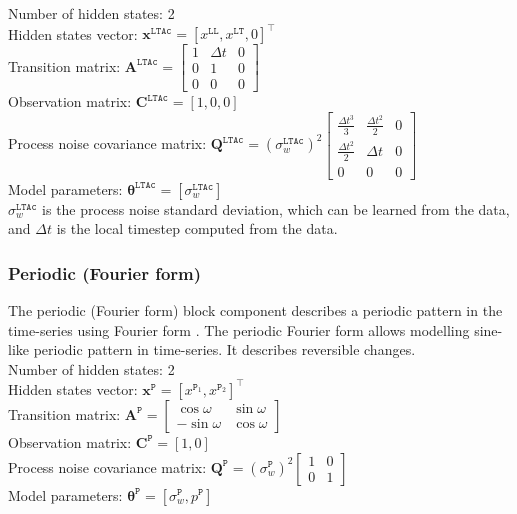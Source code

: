 \noindent
Number of hidden states: 2\\
Hidden states vector: $ \mathbf{x}^{\mathtt{LTAc}} = [x^{\mathtt{LL}}, x^{\mathtt{LT}} , 0]^{\intercal}$\\
Transition matrix: $\mathbf{A}^{\mathtt{LTAc}}= \left[\begin{array}{ccc}1&\Delta t&0\\0&1&0\\0&0&0\end{array}\right]$\\
Observation matrix: $\mathbf{C}^{\mathtt{LTAc}}=[1, 0, 0]$\\
Process noise covariance matrix: $\mathbf{Q}^{\mathtt{LTAc}}=(\sigma_{w}^{\mathtt{LTAc}})^{2}  \left[\begin{array}{ccc}\tfrac{\Delta t^{3}}{3} &\tfrac{\Delta t^{2}}{2}&0\\\tfrac{\Delta t^{2}}{2}&\Delta t&0\\0&0&0\end{array}\right] $\\
Model parameters: $\bm\theta^{\mathtt{LTAc}}=[\sigma_{w}^{\mathtt{LTAc}} ]$\\

\noindent
$\sigma_{w}^{\mathtt{LTAc}}$ is the process noise standard deviation, which can be learned from the data, and $\Delta t$ is the local timestep computed from the data.



\subsubsection{Periodic (Fourier form)}

The periodic (Fourier form) block component describes a periodic pattern in the time-series using Fourier form \cite{west1999bayesian,STC:STC2035}. 
The periodic Fourier form allows modelling sine-like periodic pattern in time-series.
It describes reversible changes.\\

\noindent
Number of hidden states: 2\\
Hidden states vector: $ \mathbf{x}^{\mathtt{P}} = [x^{\mathtt{P}_ {1}}, x^{\mathtt{P}_{2}}]^{\intercal}$\\
Transition matrix: $\mathbf{A}^{\mathtt{P}}= \left[\begin{array}{cc}\cos \omega &\sin \omega\\-\sin \omega&\cos \omega\end{array}\right]$\\
Observation matrix: $\mathbf{C}^{\mathtt{P}}=[1, 0]$\\
Process noise covariance matrix: $\mathbf{Q}^{\mathtt{P}}=(\sigma_{w}^{\mathtt{P}})^{2}\left[\begin{array}{cc}1 &0\\0&1\end{array}\right]$\\
Model parameters: $\bm\theta^{\mathtt{P}}=[\sigma_{w}^{\mathtt{P}}, p^{\mathtt{P}} ]$\\


